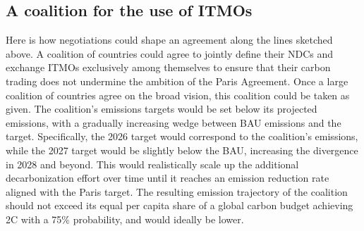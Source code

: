 \documentclass[12pt,english]{article}
\begin{document}
\subsection{A coalition for the use of ITMOs\label{subsec:itmo}}

Here is how negotiations could shape an agreement along the lines sketched above. A coalition of countries could agree to jointly define their NDCs and exchange ITMOs exclusively among themselves to ensure that their carbon trading does not undermine the ambition of the Paris Agreement. 
Once a large coalition of countries agree on the broad vision, this coalition could be taken as given. The coalition's emissions targets would be set below its projected emissions, with a gradually increasing wedge between BAU emissions and the target. Specifically, the 2026 target would correspond to the coalition's emissions, %
while the 2027 target would be slightly below the BAU, increasing the divergence in 2028 and beyond. This would realistically scale up the additional decarbonization effort over time 
until it reaches an emission reduction rate aligned with the Paris target. 
The resulting emission trajectory of the coalition should not exceed its equal per capita share of a global carbon budget achieving 2\textdegree{}C with a 75\% probability, and would ideally be lower. %
\end{document}
